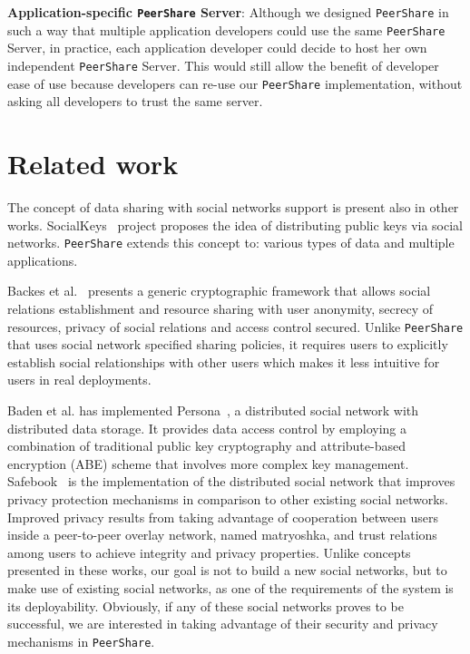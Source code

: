 \documentclass[twocolumn,a4paper,10pt]{article}
\newcommand{\peershare}{\texttt{PeerShare}\xspace}
\begin{document}
\noindent\textbf{Application-specific \peershare Server}:
Although we designed \peershare in such a way that multiple
application developers could use the same \peershare Server, in
practice, each application developer could decide to host her own
independent \peershare Server.  This would still allow the benefit of
developer ease of use because developers can re-use our \peershare
implementation, without asking all developers to trust the same
server.


\section{Related work}
\label{:related}
The concept of data sharing with social networks support is present also in other works. SocialKeys~\cite{socialkeys} project proposes the idea of distributing public keys via social networks. \peershare extends this concept to: various types of data and multiple applications. 

Backes et al.~\cite{DBLP:conf/ndss/BackesMP11} presents a generic cryptographic framework that allows social relations establishment and resource sharing with user anonymity, secrecy of resources, privacy of social relations and access control secured. Unlike \peershare that uses social network specified sharing policies, it requires users to explicitly establish social relationships with other users which makes it less intuitive for users in real deployments.

Baden et al. has implemented Persona~\cite{DBLP:conf/sigcomm/BadenBSBS09}, a distributed social network with distributed data storage. It provides data access control by employing a combination of traditional public key cryptography and attribute-based encryption (ABE) scheme that involves more complex key management. Safebook~\cite{Cutillo:2009:SPO:2288675.2294014} is the implementation of the distributed social network that improves privacy protection mechanisms in comparison to other existing social networks. Improved privacy results from taking advantage of cooperation between users inside a peer-to-peer overlay network, named matryoshka, and trust relations among users to achieve integrity and privacy properties. Unlike concepts presented in these works, our goal is not to build a new social networks, but to make use of existing social networks, as one of the requirements of the system is its deployability. Obviously, if any of these social networks proves to be successful, we are interested in taking advantage of their security and privacy mechanisms in \peershare.
\end{document}
